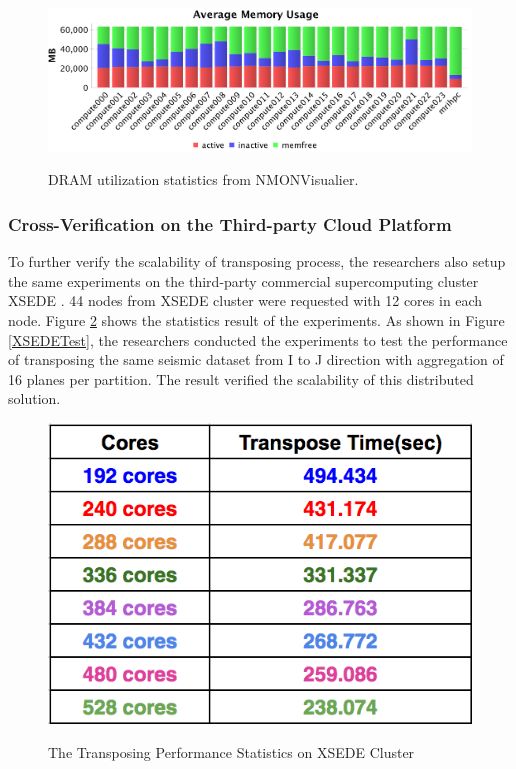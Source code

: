 \begin{figure}[h]
\centering
\includegraphics[scale=0.55]{figures/NMONMemory.png}\\
\caption{DRAM utilization statistics from NMONVisualier.}\label{NMONMEM}
\end{figure}

\subsubsection{Cross-Verification on the Third-party Cloud Platform}

To further verify the scalability of transposing process, the researchers also setup the same experiments on the third-party  commercial supercomputing cluster XSEDE \cite{XSEDE}. 44 nodes from XSEDE cluster were requested with 12 cores in each node. Figure \ref{XSEDETestStat} shows the statistics result of the experiments. As shown in Figure \ref{XSEDETest}, the researchers conducted the experiments to test the performance of transposing the same seismic dataset from I to J direction with aggregation of 16 planes per partition. The result verified the scalability of this distributed solution.

\begin{figure}[h]
\centering
\includegraphics[scale=0.6]{figures/XSEDETestStat.png}\\
\caption{The Transposing Performance Statistics on XSEDE Cluster}\label{XSEDETestStat}
\end{figure}

